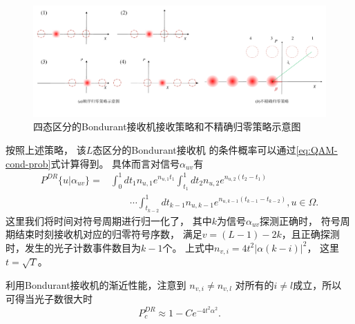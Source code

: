 \begin{figure}
\centering
  \includegraphics[width=\textwidth]{figures/chap3/Q-Bondurant-displacemet-strategy}
  \caption{四态区分的Bondurant接收机接收策略和不精确归零策略示意图}
  \label{fig:Q-Bondurant-displacemet-strategy}
\end{figure}

按照上述策略，
该$L$态区分的Bondurant接收机
的条件概率可以通过\ref{eq:QAM-cond-prob}式计算得到。
具体而言对信号$\alpha_{uv}$有
\begin{equation}
\begin{split}
P^{DR}\{u|\alpha_{uv}\} = & \int_0^1 dt_1 n_{u,1} e^{n_{u,1} t_1} \int_{t_1}^1 dt_2 n_{u,2} e^{n_{u,2} (t_2-t_1)}   \\
                          &\qquad \cdots \int_{t_{k-2}}^1 dt_{k-1} n_{u,k-1} e^{n_{u,k-1} (t_{k-1}-t_{k-2})}, u \in \Omega.
\end{split}
\label{eq:DR-cond-p}
\end{equation}
这里我们将时间对符号周期进行归一化了，
其中$k$为信号$\alpha_{uv}$探测正确时，
符号周期结束时刻接收机对应的归零符号序数，
满足$v = (L-1) - 2k$，且正确探测时，发生的光子计数事件数目为$k-1$个。
上式中$n_{v,i} = 4t^2|\alpha(k-i)|^2 $，
这里$t = \sqrt{T}$。

利用Bondurant接收机的渐近性能，注意到
$n_{v,i} \neq n_{v,l} $
对所有的$i \neq l$成立，所以
可得当光子数很大时
\begin{equation}
P_c^{DR} \approx 1 - C e^{-4t^2\alpha^2}.
\label{eq:QAM-Hybrid-approx-2}
\end{equation}


